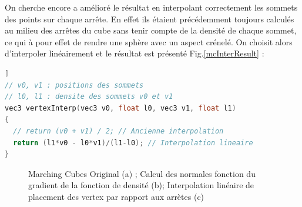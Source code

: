 \documentclass[a4paper]{article}
\begin{document}
On cherche encore a amélioré le résultat en interpolant correctement les sommets des points sur chaque arrête. En effet ils étaient précédemment toujours calculés au milieu des arrêtes du cube sans tenir compte de la densité de chaque sommet, ce qui à pour effet de rendre une sphère avec un aspect crénelé. On choisit alors d'interpoler linéairement et le résultat est présenté Fig.\ref{mcInterResult} : 
\begin{lstlisting}[language=C++,
                   directivestyle={\color{black}}
                   emph={int,char,double,float,unsigned},
                   emphstyle={\color{blue}}]]
// v0, v1 : positions des sommets
// l0, l1 : densite des sommets v0 et v1
vec3 vertexInterp(vec3 v0, float l0, vec3 v1, float l1)
{
  // return (v0 + v1) / 2; // Ancienne interpolation
  return (l1*v0 - l0*v1)/(l1-l0); // Interpolation lineaire
}
\end{lstlisting}



\begin{figure}[H]
\centering
{}
\caption{Marching Cubes Original (a) ; Calcul des normales fonction du gradient de la fonction de densité (b); Interpolation linéaire de placement des vertex par rapport aux arrètes (c)}
\end{figure}
\end{document}
